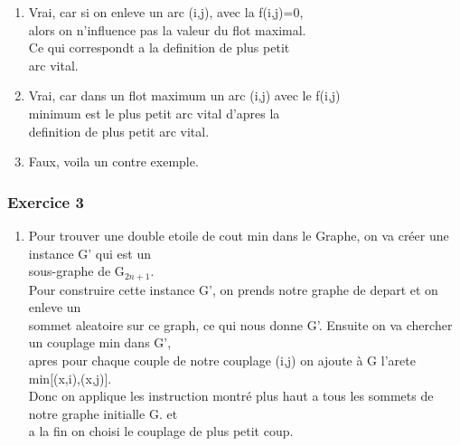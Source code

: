 \documentclass[]{article}
\begin{document}
\begin{enumerate}


\item Vrai, car si on enleve un arc (i,j), avec la f(i,j)=0,\\ alors on n'influence pas la valeur du flot maximal.\\
Ce qui correspondt a la definition de plus petit \\arc vital.

\item Vrai, car dans un flot maximum un arc (i,j) avec le f(i,j)\\ minimum est le plus petit arc vital d'apres la \\
definition de plus petit arc vital.
\item Faux, voila un contre exemple.


\usetikzlibrary{arrows}
\thispagestyle{empty}
\begin{center}
\end{center}
 
\end{enumerate} 

\subsubsection{Exercice 3}

\begin{enumerate}


\item Pour trouver une double etoile de cout min dans le Graphe, on va créer une instance G' qui est un \\
sous-graphe de G$_{2n+1}$.\\
Pour construire cette instance G', on prends notre graphe de depart et on enleve un\\
sommet aleatoire sur ce graph, ce qui nous donne G'. Ensuite on va chercher un couplage min dans G',\\
apres pour chaque couple de notre couplage (i,j) on ajoute à G l'arete min[(x,i),(x,j)]. \\
Donc on applique les instruction montré plus haut a tous les sommets de notre graphe initialle G. et \\
a la fin on choisi le couplage de plus petit coup.
\end{enumerate}
\end{document}
